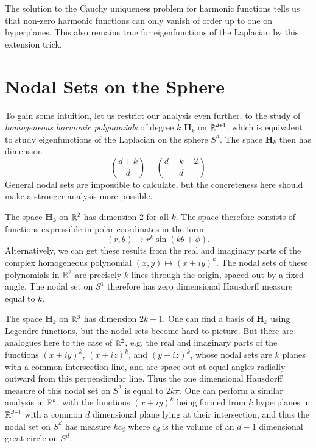 The solution to the Cauchy uniqueness problem for harmonic functions tells us that non-zero harmonic functions can only vanish of order up to one on hyperplanes. This also remains true for eigenfunctions of the Laplacian by this extension trick.

\section{Nodal Sets on the Sphere}

To gain some intuition, let us restrict our analysis even further, to the study of \emph{homogeneous harmonic polynomials} of degree $k$ $\mathbf{H}_k$ on $\operatorname{\mathbb{R}}^{d+1}$, which is equivalent to study eigenfunctions of the Laplacian on the sphere $S^d$. The space $\mathbf{H}_k$ then has dimension
%
\[ { {d + k} \choose {d} } - { {d + k - 2} \choose {d} } \]
%
General nodal sets are impossible to calculate, but the concreteness here should make a stronger analysis more possible.

\begin{example}
    The space $\mathbf{H}_k$ on $\operatorname{\mathbb{R}}^2$ has dimension $2$ for all $k$. The space therefore consists of functions expressible in polar coordinates in the form
    \[ (r,\theta) \mapsto r^k \sin(k \theta + \phi). \]
    Alternatively, we can get these results from the real and imaginary parts of the complex homogeneous polynomial $(x,y) \mapsto (x + iy)^k$. The nodal sets of these polynomials in $\operatorname{\mathbb{R}}^2$ are precisely $k$ lines through the origin, spaced out by a fixed angle. The nodal set on $S^1$ therefore has zero dimensional Hausdorff measure equal to $k$.
\end{example}

\begin{example}
    The space $\mathbf{H}_k$ on $\operatorname{\mathbb{R}}^3$ has dimension $2k+1$. One can find a basis of $\mathbf{H}_k$ using Legendre functions, but the nodal sets become hard to picture. But there are analogues here to the case of $\operatorname{\mathbb{R}}^2$, e.g. the real and imaginary parts of the functions $(x + i y)^k$, $(x + iz)^k$, and $(y + iz)^k$, whose nodal sets are $k$ planes with a common intersection line, and are space out at equal angles radially outward from this perpendicular line. Thus the one dimensional Hausdorff measure of this nodal set on $S^2$ is equal to $2k \pi$. One can perform a similar analysis in $\operatorname{\mathbb{R}}^n$, with the functions $(x + i y)^k$ being formed from $k$ hyperplanes in $\operatorname{\mathbb{R}}^{d+1}$ with a common $d$ dimensional plane lying at their intersection, and thus the nodal set on $S^d$ has measure $k c_d$ where $c_d$ is the volume of an $d-1$ dimensional great circle on $S^d$.
\end{example}


